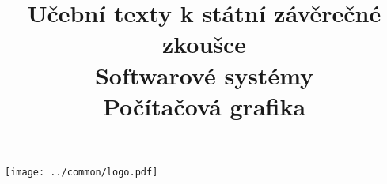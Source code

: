 \clearpage

\clearpage

\title{\LARGE Učební texty k státní závěrečné zkoušce \\ Softwarové systémy \\ Počítačová grafika}




\maketitle

\vspace{10mm}
\begin{center}
\texttt{[image: ../common/logo.pdf]}
\end{center} 

\clearpage

\clearpage

\tableofcontents









